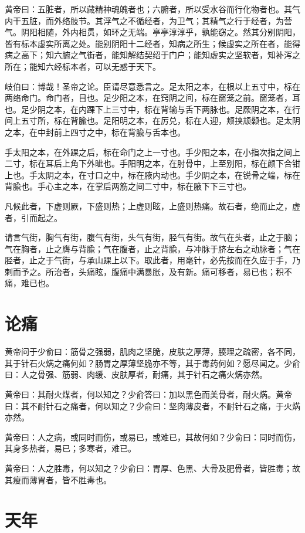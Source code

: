 \documentclass[12pt,UTF8]{ctexbook}
\begin{document}
	黄帝曰：五脏者，所以藏精神魂魄者也；六腑者，所以受水谷而行化物者也。其气内干五脏，而外络肢节。其浮气之不循经者，为卫气；其精气之行于经者，为营气。阴阳相随，外内相贯，如环之无端。亭亭淳淳乎，孰能窃之。然其分别阴阳，皆有标本虚实所离之处。能别阴阳十二经者，知病之所生；候虚实之所在者，能得病之高下；知六腑之气街者，能知解结契绍于门户；能知虚实之坚软者，知补泻之所在；能知六经标本者，可以无惑于天下。
	
	岐伯曰：博哉！圣帝之论。臣请尽意悉言之。足太阳之本，在根以上五寸中，标在两络命门。命门者，目也。足少阳之本，在窍阴之间，标在窗笼之前。窗笼者，耳也。足少阴之本，在内踝下上三寸中，标在背输与舌下两脉也。足厥阴之本，在行间上五寸所，标在背腧也。足阳明之本，在厉兑，标在人迎，颊挟颃颡也。足太阴之本，在中封前上四寸之中，标在背腧与舌本也。
	
	手太阳之本，在外踝之后，标在命门之上一寸也。手少阳之本，在小指次指之间上二寸，标在耳后上角下外眦也。手阳明之本，在肘骨中，上至别阳，标在颜下合钳上也。手太阴之本，在寸口之中，标在腋内动也。手少阴之本，在锐骨之端，标在背腧也。手心主之本，在掌后两筋之间二寸中，标在腋下下三寸也。
	
	凡候此者，下虚则厥，下盛则热；上虚则眩，上盛则热痛。故石者，绝而止之，虚者，引而起之。
	
	请言气街，胸气有街，腹气有街，头气有街，胫气有街。故气在头者，止之于脑；气在胸者，止之膺与背腧；气在腹者，止之背腧，与冲脉于脐左右之动脉者；气在胫者，止之于气街，与承山踝上以下。取此者，用毫针，必先按而在久应于手，乃刺而予之。所治者，头痛眩，腹痛中满暴胀，及有新。痛可移者，易已也；积不痛，难已也。
	\chapter{论痛}
	
	黄帝问于少俞曰：筋骨之强弱，肌肉之坚脆，皮肤之厚薄，腠理之疏密，各不同，其于针石火焫之痛何如？肠胃之厚薄坚脆亦不等，其于毒药何如？愿尽闻之。少俞曰：人之骨强、筋弱、肉缓、皮肤厚者，耐痛，其于针石之痛火焫亦然。
	
	黄帝曰：其耐火煤者，何以知之？少俞答曰：加以黑色而美骨者，耐火焫。黄帝曰：其不耐针石之痛者，何以知之？少俞曰：坚肉薄皮者，不耐针石之痛，于火焫亦然。
	
	黄帝曰：人之病，或同时而伤，或易已，或难已，其故何如？少俞曰：同时而伤，其身多热者，易已；多寒者，难已。
	
	黄帝曰：人之胜毒，何以知之？少俞曰：胃厚、色黑、大骨及肥骨者，皆胜毒；故其瘦而薄胃者，皆不胜毒也。

	\chapter{天年}
\end{document}

